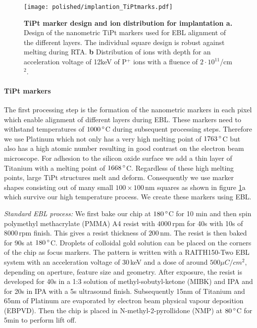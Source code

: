 \begin{figure}
	\centering
	\texttt{[image: polished/implantion\_TiPtmarks.pdf]}
	\caption[TiPt marker design and ion distribution for implantation]{\textbf{TiPt marker design and ion distribution for implantation a.} Design of the nanometric TiPt markers used for EBL alignment of the different layers. The individual square design is robust against melting during RTA. \textbf{b} Distribution of ions with depth for an acceleration voltage of 12keV of P$^+$ ions with a fluence of $2\cdot10^{11}$/cm$^2$.   }
	\label{fig:TiPtmarks_impl}
\end{figure}

\paragraph*{TiPt markers}
The first processing step is the formation of the nanometric markers in each pixel which enable alignment of different layers during EBL. These markers need to withstand temperatures of $1000\,\degree$C during subsequent processing steps. Therefore we use Platinum which not only has a very high melting point of $1763\,\degree$C but also has a high atomic number resulting in good contrast on the electron beam microscope. For adhesion to the silicon oxide surface we add a thin layer of Titanium with a melting point of $1668\,\degree$C. Regardless of these high melting points, large TiPt structures melt and deform. Consequently we use marker shapes consisting out of many small $100\times100\,$nm squares as shown in figure \ref{fig:TiPtmarks_impl}a which survive our high temperature process. 
We create these markers using EBL.

\textit{Standard EBL process:} We first bake our chip at $180\,\degree$C for 10 min and then spin polymethyl methacrylate (PMMA) A4 resist with $4000\,$rpm for 40s with 10s of $8000\,$rpm finish. This gives a resist thickness of $200\,$nm. The resist is then baked for 90s at $180\,\degree$C. Droplets of colloidal gold solution can be placed on the corners of the chip as focus markers. The pattern is written with a RAITH150-Two EBL system with an acceleration voltage of $30\,$keV and a dose of around $500\mu C/cm^2$, depending on aperture, feature size and geometry. After exposure, the resist is developed for 40s in a 1:3 solution of methyl-sobutyl-ketone (MIBK) and IPA and for 20s in IPA with a 5s ultrasound finish. 
Subsequently 15nm of Titanium and 65nm of Platinum are evaporated by electron beam physical vapour deposition (EBPVD). Then the chip is placed in N-methyl-2-pyrollidone (NMP) at $80\,\degree$C for 5min to perform lift off. 

